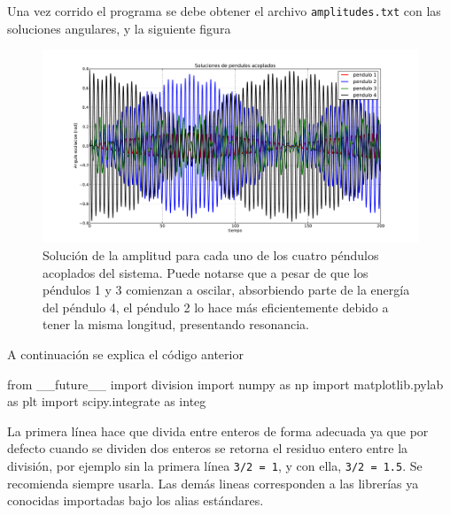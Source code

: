 Una vez corrido el programa se debe obtener el archivo \texttt{amplitudes.txt} 
con las soluciones angulares, y la siguiente figura 


\begin{figure}[htbp]
	\centering
	\includegraphics[width=1.0\textwidth]
	{./pictures/demo2_03(02).pdf}

	\caption{\small{Solución de la amplitud para cada uno de los cuatro 
	péndulos acoplados del sistema. Puede notarse que a pesar de que los
	péndulos 1 y 3 comienzan a oscilar, absorbiendo parte de la energía 
	del péndulo 4, el péndulo 2 lo hace más eficientemente debido a tener 
	la misma longitud, presentando resonancia.}}
	
	\label{fig:four_pedulum}
\end{figure}


A continuación se explica el código anterior

\begin{listing}[style=python, numbers = none]
from __future__ import division
import numpy as np
import matplotlib.pylab as plt
import scipy.integrate as integ
\end{listing}
La primera línea hace que \python divida entre enteros de forma adecuada 
ya que por defecto cuando se dividen dos enteros se retorna el residuo entero
entre la división, por ejemplo sin la primera línea \texttt{3/2 = 1}, 
y con ella, \texttt{3/2 = 1.5}. Se recomienda siempre usarla. Las demás
lineas corresponden a las librerías ya conocidas importadas bajo los alias
estándares.



